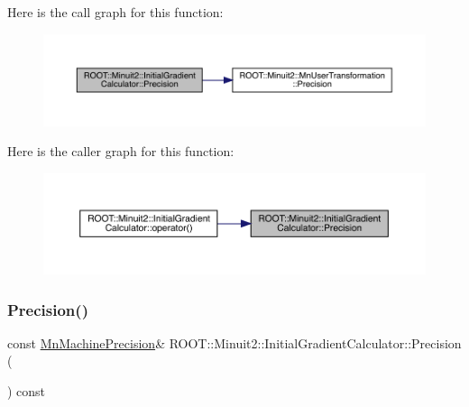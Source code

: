 Here is the call graph for this function\+:\nopagebreak
\begin{figure}[H]
\begin{center}
\leavevmode
\includegraphics[width=350pt]{d3/dcf/classROOT_1_1Minuit2_1_1InitialGradientCalculator_a7b85d42dfbb0581c4cb5f8ad47a798a0_cgraph}
\end{center}
\end{figure}
Here is the caller graph for this function\+:\nopagebreak
\begin{figure}[H]
\begin{center}
\leavevmode
\includegraphics[width=350pt]{d3/dcf/classROOT_1_1Minuit2_1_1InitialGradientCalculator_a7b85d42dfbb0581c4cb5f8ad47a798a0_icgraph}
\end{center}
\end{figure}
\mbox{\label{classROOT_1_1Minuit2_1_1InitialGradientCalculator_a9f3821f6e60137b0cc9f25f85d96fbc5}} 
\subsubsection{\texorpdfstring{Precision()}{Precision()}\hspace{0.1cm}{\footnotesize\ttfamily [2/2]}}
{\footnotesize\ttfamily const \mbox{\hyperlink{classROOT_1_1Minuit2_1_1MnMachinePrecision}{Mn\+Machine\+Precision}}\& R\+O\+O\+T\+::\+Minuit2\+::\+Initial\+Gradient\+Calculator\+::\+Precision (\begin{DoxyParamCaption}{ }\end{DoxyParamCaption}) const}

